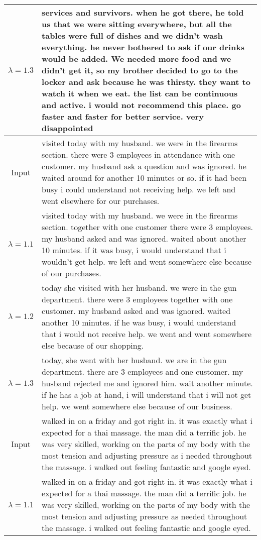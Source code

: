 \begin{table}[ht]
{\begin{tabular}[t]{c|p{16cm}}
\small $\lambda = 1.3$	&services and survivors. when he got there, he told us that we were sitting everywhere, but all the tables were full of dishes and we didn't wash everything. he never bothered to ask if our drinks would be added. We needed more food and we didn't get it, so my brother decided to go to the locker and ask because he was thirsty. they want to watch it when we eat. the list can be continuous and active. i would not recommend this place. go faster and faster for better service. very disappointed \\\hline
\small Input	&visited today with my husband. we were in the firearms section. there were 3 employees in attendance with one customer. my husband ask a question and was ignored. he waited around for another 10 minutes or so. if it had been busy i could understand not receiving help. we left and went elsewhere for our purchases. \\
\small $\lambda = 1.1$	&visited today with my husband. we were in the firearms section. together with one customer there were 3 employees. my husband asked and was ignored. waited about another 10 minutes. if it was busy, i would understand that i wouldn't get help. we left and went somewhere else because of our purchases. \\
\small $\lambda = 1.2$	&today she visited with her husband. we were in the gun department. there were 3 employees together with one customer. my husband asked and was ignored. waited another 10 minutes. if he was busy, i would understand that i would not receive help. we went and went somewhere else because of our shopping. \\
\small $\lambda = 1.3$	&today, she went with her husband. we are in the gun department. there are 3 employees and one customer. my husband rejected me and ignored him. wait another minute. if he has a job at hand, i will understand that i will not get help. we went somewhere else because of our business. \\\hline
\small Input	&walked in on a friday and got right in. it was exactly what i expected for a thai massage. the man did a terrific job. he was very skilled, working on the parts of my body with the most tension and adjusting pressure as i needed throughout the massage. i walked out feeling fantastic and google eyed. \\
\small $\lambda = 1.1$	&walked in on a friday and got right in. it was exactly what i expected for a thai massage. the man did a terrific job. he was very skilled, working on the parts of my body with the most tension and adjusting pressure as needed throughout the massage. i walked out feeling fantastic and google eyed. \\

\end{tabular}}
\end{table}
